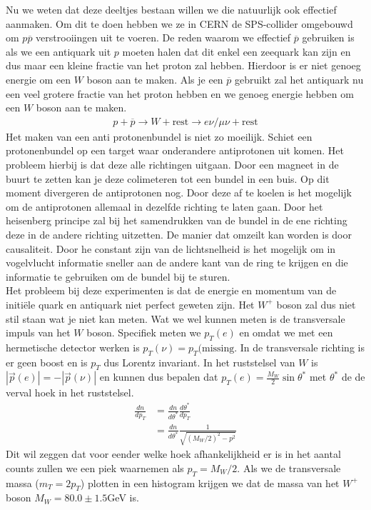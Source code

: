\documentclass[../main.tex]{subfiles}
\begin{document}
Nu we weten dat deze deeltjes bestaan willen we die natuurlijk ook effectief aanmaken. Om dit te doen hebben we ze in CERN de SPS-collider omgebouwd om $p\overline p$ verstrooiingen uit te voeren. De reden waarom we effectief $\overline p$ gebruiken is als we een antiquark uit $p$ moeten halen dat dit enkel een zeequark kan zijn en dus maar een kleine fractie van het proton zal hebben. Hierdoor is er niet genoeg energie om een $W$ boson aan te maken. Als je een $\overline p$ gebruikt zal het antiquark nu een veel grotere fractie van het proton hebben en we genoeg energie hebben om een $W$ boson aan te maken.
\begin{equation}
    \begin{aligned}
        \label{eq:w_productie}
        p + \overline p \rightarrow W + \text{rest} \rightarrow e\nu / \mu\nu + \text{rest}
    \end{aligned}
\end{equation}
Het maken van een anti protonenbundel is niet zo moeilijk. Schiet een protonenbundel op een target waar onderandere antiprotonen uit komen. Het probleem hierbij is dat deze alle richtingen uitgaan. Door een magneet in de buurt te zetten kan je deze colimeteren tot een bundel in een buis. Op dit moment divergeren de antiprotonen nog. Door deze af te koelen is het mogelijk om de antiprotonen allemaal in dezelfde richting te laten gaan. Door het heisenberg principe zal bij het samendrukken van de bundel in de ene richting deze in de andere richting uitzetten. De manier dat omzeilt kan worden is door causaliteit. Door he constant zijn van de lichtsnelheid is het mogelijk om in vogelvlucht informatie sneller aan de andere kant van de ring te krijgen en die informatie te gebruiken om de bundel bij te sturen.\\
Het probleem bij deze experimenten is dat de energie en momentum van de initiële quark en antiquark niet perfect geweten zijn. Het $W^+$ boson zal dus niet stil staan wat je niet kan meten. Wat we wel kunnen meten is de transversale impuls van het $W$ boson. Specifiek meten we $p_T(e)$ en omdat we met een hermetische detector werken is $p_T(\nu) = p_T(\text{missing}$. In de transversale richting is er geen boost en is $p_T$ dus Lorentz invariant. In het ruststelsel van $W$ is $|\vec{p}(e)|=-|\vec{p}(\nu)|$ en kunnen dus bepalen dat $p_T(e) = \frac{M_W}{2} \sin\theta^*$ met $\theta^*$ de de verval hoek in het ruststelsel.
\begin{equation}
    \begin{aligned}
        \label{eq:mom_dist}
        \frac{dn}{dp_T} &= \frac{dn}{d\theta^*} \frac{d\theta^*}{dp_T} \\
                        &= \frac{dn}{d\theta^*} \frac{1}{\sqrt{(M_W/2)^2-p^2}} 
    \end{aligned}
\end{equation}
Dit wil zeggen dat voor eender welke hoek afhankelijkheid er is in het aantal counts zullen we een piek waarnemen als $p_T=M_W/2$. Als we de transversale massa ($m_T=2p_T$) plotten in een histogram krijgen we dat de massa van het $W^+$ boson $M_W=80.0\pm 1.5$GeV is.
\end{document}
